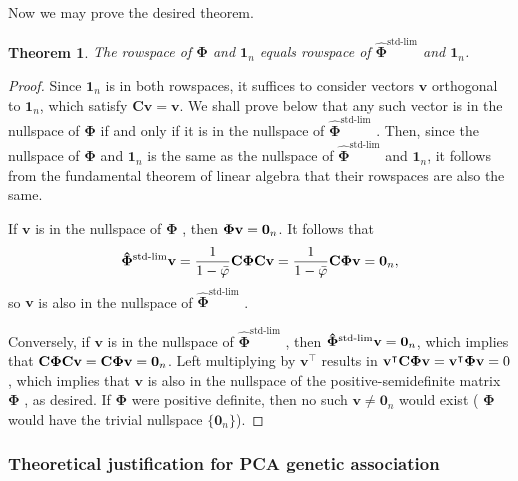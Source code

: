 \documentclass[11pt]{article}
\newcommand{\kinMat}{%
  \ensuremath{%
    \mathbf{\Phi}
  }%
  \xspace%
}%
\newcommand{\kinMatStdLim}{%
  \ensuremath{%
    \mathbf{\hat{\Phi}}^\text{std-lim}
  }%
  \xspace%
}%
\newtheorem*{thm}{Theorem}
\begin{document}
Now we may prove the desired theorem.

\begin{thm}
  The rowspace of \kinMat and $\mathbf{1}_n$ equals rowspace of \kinMatStdLim and $\mathbf{1}_n$.
\end{thm}

\begin{proof}
  Since $\mathbf{1}_n$ is in both rowspaces, it suffices to consider vectors $\mathbf{v}$ orthogonal to $\mathbf{1}_n$, which satisfy $\mathbf{C} \mathbf{v} = \mathbf{v}$.
  We shall prove below that any such vector is in the nullspace of \kinMat if and only if it is in the nullspace of \kinMatStdLim.
  Then, since the nullspace of \kinMat and $\mathbf{1}_n$ is the same as the nullspace of \kinMatStdLim and $\mathbf{1}_n$, it follows from the fundamental theorem of linear algebra that their rowspaces are also the same.
  
  If $\mathbf{v}$ is in the nullspace of \kinMat, then $\kinMat \mathbf{v} = \mathbf{0}_n$.
  It follows that
  $$
  \kinMatStdLim \mathbf{v}
  =
  \frac{1}{1 - \bar{\varphi}}
  \mathbf{C} \kinMat \mathbf{C} \mathbf{v}
  =
  \frac{1}{1 - \bar{\varphi}}
  \mathbf{C} \kinMat \mathbf{v}
  =
  \mathbf{0}_n
  ,
  $$
  so $\mathbf{v}$ is also in the nullspace of \kinMatStdLim.
  
  Conversely, if $\mathbf{v}$ is in the nullspace of \kinMatStdLim, then $\kinMatStdLim \mathbf{v} = \mathbf{0}_n$, which implies that
  $
  \mathbf{C} \kinMat \mathbf{C} \mathbf{v}
  =
  \mathbf{C} \kinMat \mathbf{v}
  =
  \mathbf{0}_n
  $.
  Left multiplying by $\mathbf{v}^\intercal$ results in
  $
  \mathbf{v}^\intercal \mathbf{C} \kinMat \mathbf{v}
  =
  \mathbf{v}^\intercal \kinMat \mathbf{v}
  =
  0
  $, which implies that $\mathbf{v}$ is also in the nullspace of the positive-semidefinite matrix \kinMat, as desired.
  If \kinMat were positive definite, then no such $\mathbf{v} \ne \mathbf{0}_n$ would exist (\kinMat would have the trivial nullspace $\{ \mathbf{0}_n \}$).
\end{proof}

\subsubsection{Theoretical justification for PCA genetic association}
\end{document}
